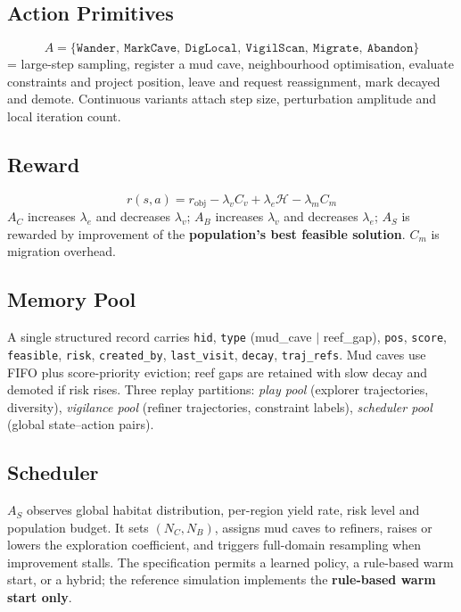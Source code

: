\documentclass[11pt,a4paper]{article}
\begin{document}
\subsection{Action Primitives}
\begin{equation}
A = \{\texttt{Wander},\ \texttt{MarkCave},\ \texttt{DigLocal},\ \texttt{VigilScan},\ \texttt{Migrate},\ \texttt{Abandon}\}
\end{equation}
= large-step sampling, register a mud cave, neighbourhood optimisation, evaluate constraints and project position, leave and request reassignment, mark decayed and demote. Continuous variants attach step size, perturbation amplitude and local iteration count.

\subsection{Reward}
\begin{equation}
r(s,a) = r_{\mathrm{obj}} - \lambda_v C_v + \lambda_e \mathcal{H} - \lambda_m C_m
\end{equation}
$A_C$ increases $\lambda_e$ and decreases $\lambda_v$; $A_B$ increases $\lambda_v$ and decreases $\lambda_e$; $A_S$ is rewarded by improvement of the \textbf{population's best feasible solution}. $C_m$ is migration overhead.

\subsection{Memory Pool}
A single structured record carries \texttt{hid}, \texttt{type} (mud\_cave $|$ reef\_gap), \texttt{pos}, \texttt{score}, \texttt{feasible}, \texttt{risk}, \texttt{created\_by}, \texttt{last\_visit}, \texttt{decay}, \texttt{traj\_refs}. Mud caves use FIFO plus score-priority eviction; reef gaps are retained with slow decay and demoted if risk rises. Three replay partitions: \emph{play pool} (explorer trajectories, diversity), \emph{vigilance pool} (refiner trajectories, constraint labels), \emph{scheduler pool} (global state--action pairs).

\subsection{Scheduler}
$A_S$ observes global habitat distribution, per-region yield rate, risk level and population budget. It sets $(N_C,N_B)$, assigns mud caves to refiners, raises or lowers the exploration coefficient, and triggers full-domain resampling when improvement stalls. The specification permits a learned policy, a rule-based warm start, or a hybrid; the reference simulation implements the \textbf{rule-based warm start only}.
\end{document}
